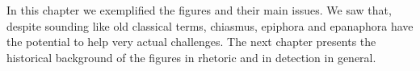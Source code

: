 In this chapter we exemplified the figures and their main issues. We saw that, despite sounding like old classical terms, chiasmus, epiphora and epanaphora have the potential to help very actual challenges. The next chapter presents the historical background of the figures in rhetoric and in detection in general.






%